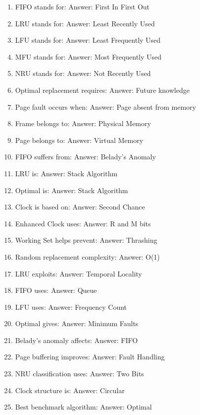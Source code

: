 \begin{enumerate}
\item FIFO stands for:
Answer: First In First Out

\item LRU stands for:
Answer: Least Recently Used

\item LFU stands for:
Answer: Least Frequently Used

\item MFU stands for:
Answer: Most Frequently Used

\item NRU stands for:
Answer: Not Recently Used

\item Optimal replacement requires:
Answer: Future knowledge

\item Page fault occurs when:
Answer: Page absent from memory

\item Frame belongs to:
Answer: Physical Memory

\item Page belongs to:
Answer: Virtual Memory

\item FIFO suffers from:
Answer: Belady's Anomaly

\item LRU is:
Answer: Stack Algorithm

\item Optimal is:
Answer: Stack Algorithm

\item Clock is based on:
Answer: Second Chance

\item Enhanced Clock uses:
Answer: R and M bits

\item Working Set helps prevent:
Answer: Thrashing

\item Random replacement complexity:
Answer: O(1)

\item LRU exploits:
Answer: Temporal Locality

\item FIFO uses:
Answer: Queue

\item LFU uses:
Answer: Frequency Count

\item Optimal gives:
Answer: Minimum Faults

\item Belady's anomaly affects:
Answer: FIFO

\item Page buffering improves:
Answer: Fault Handling

\item NRU classification uses:
Answer: Two Bits

\item Clock structure is:
Answer: Circular

\item Best benchmark algorithm:
Answer: Optimal
\end{enumerate}

